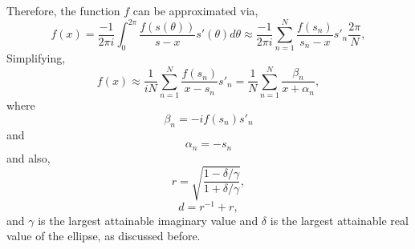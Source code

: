 \documentclass[10pt,a4paper,final]{article}
\begin{document}
Therefore, the function $f$ can be approximated via,
\begin{equation}
f(x)=\frac{-1}{2\pi i} \int_{0}^{2\pi}\frac{f(s(\theta))}{s-x} s'(\theta) d\theta \approx 
\frac{-1}{2\pi i} \sum_{n=1}^{N}\frac{f(s_n)}{s_n-x} s'_ n \frac{2\pi}{ N},
\end{equation}
Simplifying,
\begin{equation}
f(x)\approx 
\frac{1}{ iN} \sum_{n=1}^{N}\frac{f(s_n)}{x-s_n} s'_ n =\frac{1}{N}\sum_{n=1}^{N}\frac{\beta_n}{x+\alpha_n},
\end{equation}
where
\begin{equation}
\beta_n=-if(s_n)s'_ n
\end{equation}
and 
\begin{equation}
\alpha_n=-s_n
\end{equation}
and also,
\begin{equation}
r=\sqrt{\frac{1-\delta/\gamma}{1+\delta/\gamma}},
\end{equation}
\begin{equation}
d=r^{-1}+r,
\end{equation}
and $\gamma$ is the largest attainable imaginary value and $\delta$ is the largest attainable real value of the ellipse, as discussed before.

\clearpage



 
\end{document}
